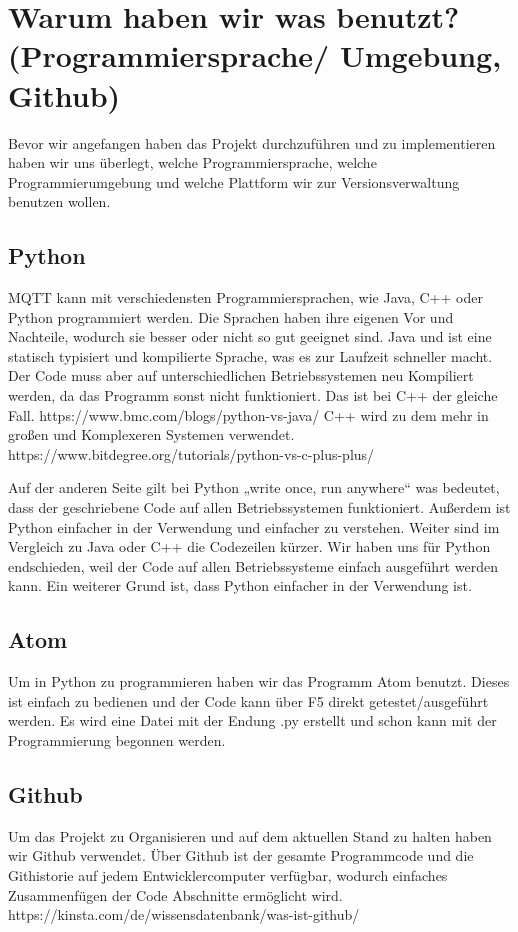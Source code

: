 


\section{Warum haben wir was benutzt? (Programmiersprache/ Umgebung, Github)}
Bevor wir angefangen haben das Projekt durchzuführen und zu implementieren haben wir uns überlegt, welche Programmiersprache, welche Programmierumgebung und welche Plattform wir zur Versionsverwaltung benutzen wollen.

\subsection{Python}
MQTT kann mit verschiedensten Programmiersprachen, wie Java, C++ oder Python programmiert werden.
Die Sprachen haben ihre eigenen Vor und Nachteile, wodurch sie besser oder nicht so gut geeignet sind.
Java und ist eine statisch typisiert und kompilierte Sprache, was es zur Laufzeit schneller macht. Der Code muss aber auf unterschiedlichen Betriebssystemen neu Kompiliert werden, da das Programm sonst nicht funktioniert. Das ist bei C++ der gleiche Fall. https://www.bmc.com/blogs/python-vs-java/
C++ wird zu dem mehr in großen und Komplexeren Systemen verwendet.
https://www.bitdegree.org/tutorials/python-vs-c-plus-plus/

Auf der anderen Seite gilt bei Python „write once, run anywhere“ was bedeutet, dass der geschriebene Code auf allen Betriebssystemen funktioniert. 
Außerdem ist Python einfacher in der Verwendung und einfacher zu verstehen. Weiter sind im Vergleich zu Java oder C++ die Codezeilen kürzer.
Wir haben uns für Python endschieden, weil der Code auf allen Betriebssysteme einfach ausgeführt werden kann. Ein weiterer Grund ist, dass Python einfacher in der Verwendung ist.


\subsection{Atom}
Um in Python zu programmieren haben wir das Programm Atom benutzt. Dieses ist einfach zu bedienen und der Code kann über F5 direkt getestet/ausgeführt werden.
Es wird eine Datei mit der Endung .py erstellt und schon kann mit der Programmierung begonnen werden.

\subsection{Github}
Um das Projekt zu Organisieren und auf dem aktuellen Stand zu halten haben wir Github verwendet.
Über Github ist der gesamte Programmcode und die Githistorie auf jedem Entwicklercomputer verfügbar, wodurch einfaches Zusammenfügen der Code Abschnitte  ermöglicht wird.
https://kinsta.com/de/wissensdatenbank/was-ist-github/